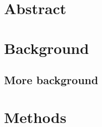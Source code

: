 
\newcommand{\assignmenttype}{Assignment}
\newcommand{\assignmentnumber}{0}
\newcommand{\assignmenttitle}{Path Planning Example}
\newcommand{\assignmentdue}{2021-01-01}
\newcommand{\assignmentabstract}{\lipsum[2]}




\section{Abstract}

\lipsum[1]

\section{Background}

\lipsum[2]

\subsection{More background}

\lipsum[3]

\section{Methods}

\lipsum[4]




